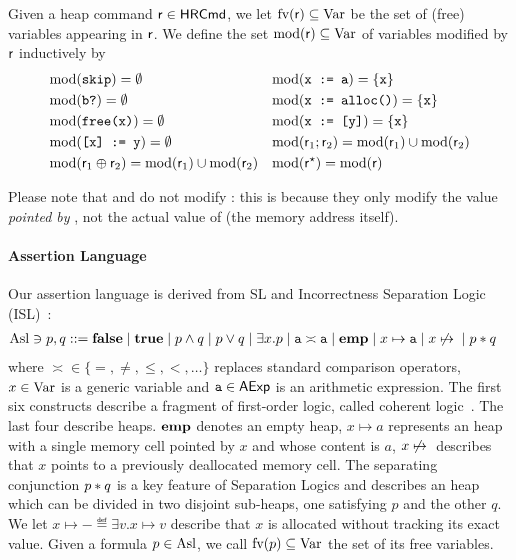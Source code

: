 Given a heap command $\mathsf{r} \in \mathsf{HRCmd}$, we let $\text{fv}(\mathsf{r}) \subseteq \text{Var}$ be the set of (free) variables appearing in $\mathsf{r}$. We define the set $\text{mod}(\mathsf{r}) \subseteq \text{Var}$ of variables modified by $\mathsf{r}$ inductively by
\begin{align*}
	 & \text{mod}(\texttt{skip}) = \emptyset \qquad                                        &  & \text{mod}(\texttt{x := a}) = \{ \texttt{x} \}                                \\
	 & \text{mod}(\texttt{b?}) = \emptyset \qquad                                          &  & \text{mod}(\texttt{x := alloc()}) = \{ \texttt{x} \}                          \\
	 & \text{mod}(\texttt{free(x)}) = \emptyset \qquad                                     &  & \text{mod}(\texttt{x := [y]}) = \{ \texttt{x} \}                              \\
	 & \text{mod}(\texttt{[x] := y}) = \emptyset                                           &  & \text{mod}(\mathsf{r}_1; \mathsf{r}_2) = \text{mod}(\mathsf{r}_1) \cup \text{mod}(\mathsf{r}_2) \\
	 & \text{mod}(\mathsf{r}_1 \oplus \mathsf{r}_2) = \text{mod}(\mathsf{r}_1) \cup \text{mod}(\mathsf{r}_2) &  & \text{mod}(\mathsf{r}^{\star}) = \text{mod}(\mathsf{r})
\end{align*}

Please note that  and  do not modify : this is because they only modify the value \emph{pointed by} , not the actual value of  (the memory address itself).

\paragraph*{Assertion Language}
Our assertion language is derived from SL and Incorrectness Separation Logic (ISL)~\cite{RBDDOV20}:
\begin{align*}
	\text{Asl} \ni p, q ::= & \; \textbf{false} \mid \textbf{true} \mid p \land q \mid p \lor q \mid \exists x . p \mid \texttt{a} \asymp \texttt{a} \mid \textbf{emp} \mid x \mapsto \texttt{a} \mid x \not\mapsto{} \mid p * q
\end{align*}
where $\asymp \in \{ =, \neq, \le, <, \dots \}$ replaces standard comparison operators, $x \in \text{Var}$ is a generic variable and $\texttt{a} \in \mathsf{AExp}$ is an arithmetic expression. The first six constructs describe a fragment of first-order logic, called coherent logic~\cite{BC05}. The last four describe heaps.
$\textbf{emp}$ denotes an empty heap, $x \mapsto a$ represents an heap with a single memory cell pointed by $x$ and whose content is $a$, $x \not\mapsto{}$ describes that $x$ points to a previously deallocated memory cell.
The separating conjunction $p * q$ is a key feature of Separation Logics and describes an heap which can be divided in two disjoint sub-heaps, one satisfying $p$ and the other $q$.
We let $x \mapsto - \eqdef \exists v. x \mapsto v$ describe that $x$ is allocated without tracking its exact value.
Given a formula $p \in \text{Asl}$, we call $\text{fv}(p) \subseteq \text{Var}$ the set of its free variables.

